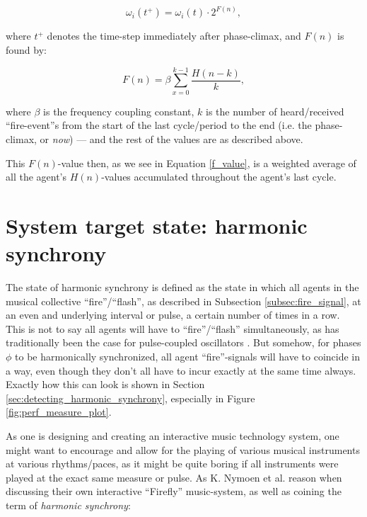 \begin{equation}
\label{freq_adj}
	\omega_i(t^+) = \omega_i(t) \cdot 2^{F(n)},
\end{equation}

where $t^+$ denotes the time-step immediately after phase-climax, and $F(n)$ is found by:

\begin{equation}
\label{f_value}
	F(n) = \beta\sum_{x=0}^{k-1}\frac{H(n-k)}{k},
\end{equation}

where $\beta$ is the frequency coupling constant, $k$ is the number of heard/received ``fire-event''s from the start of the last cycle/period to the end (i.e. the phase-climax, or \textit{now}) — and the rest of the values are as described above.

This $F(n)$-value then, as we see in Equation \eqref{f_value}, is a weighted average of all the agent's $H(n)$-values accumulated throughout the agent's last cycle.














\section{System target state: harmonic synchrony}
\label{sec:harmonic_synchrony}

The state of harmonic synchrony is defined \cite{nymoen_synch} as the state in which all agents in the musical collective ``fire''/``flash'', as described in Subsection \ref{subsec:fire_signal}, at an even and underlying interval or pulse, a certain number of times in a row. This is not to say all agents will have to ``fire''/``flash'' simultaneously, as has traditionally been the case for pulse-coupled oscillators \cite{}. But somehow, for phases $\phi$ to be harmonically synchronized, all agent ``fire''-signals will have to coincide in a way, even though they don't all have to incur exactly at the same time always. Exactly how this can look is shown in Section \ref{sec:detecting_harmonic_synchrony}, especially in Figure \ref{fig:perf_measure_plot}.

As one is designing and creating an interactive music technology system, one might want to encourage and allow for the playing of various musical instruments at various rhythms/paces, as it might be quite boring if all instruments were played at the exact same measure or pulse. As K. Nymoen et al. \cite{nymoen_synch} reason when discussing their own interactive ``Firefly'' music-system, as well as coining the term of \textit{harmonic synchrony}: \nl

